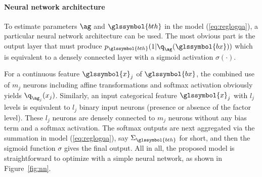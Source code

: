 \paragraph{Neural network architecture}

To estimate parameters $\ag$ and $\glssymbol{bth}$ in the model (\ref{eq:reglogqa}), a particular neural network architecture can be used. The most obvious part is the output layer that must produce $p_{\glssymbol{bth}}(1|\q_{\ag}(\glssymbol{bx}))$ which is equivalent to a densely connected layer with a sigmoid activation $\sigma (\cdot)$.

For a continuous feature $\glssymbol{x}_j$ of $\glssymbol{bx}$, the combined use of $m_j$ neurons including affine transformations and softmax activation obviously yields $\q_{\ag_{j}}(x_j)$. Similarly, an input categorical feature $\glssymbol{x}_j$ with $l_j$ levels is equivalent to $l_j$ binary input neurons (presence or absence of the factor level). These $l_j$ neurons are densely connected to $m_j$ neurons without any bias term and a softmax activation. The softmax outputs are next aggregated via the summation in model (\ref{eq:reglogqa}), say $\Sigma_{\glssymbol{bth}}$ for short, and then the sigmoid function $\sigma$ gives the final output. All in all, the proposed model is straightforward to optimize with a simple neural network, as shown in Figure~\ref{fig:nn}.


\def\layersep{2.5cm}

